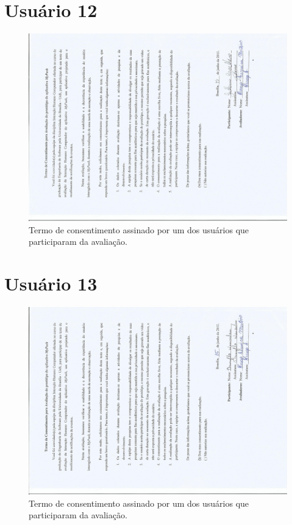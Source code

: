 \begin{anexosenv}
	
	 \section*{Usuário 12}
    \begin{figure}[!htbp]
      \centering
      \includegraphics[scale=0.6, angle=-90]{editaveis/figuras/cavalheiro}
      \caption{Termo de consentimento assinado por um dos usuários que participaram da avaliação.}
      \label{termo_consentimento_1}
    \end{figure}
	
	
	 \section*{Usuário 13}
    \begin{figure}[!htbp]
      \centering
      \includegraphics[scale=0.6, angle=-90]{editaveis/figuras/danilo}
      \caption{Termo de consentimento assinado por um dos usuários que participaram da avaliação.}
      \label{termo_consentimento_1}
    \end{figure}
	

\end{anexosenv}
